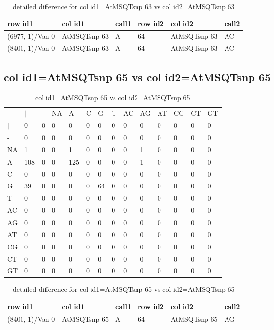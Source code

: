 \begin{center}
\begin{longtable}{|l|l|l|l|l|l|}
\caption{detailed difference for col id1=AtMSQTsnp 63 vs col id2=AtMSQTsnp 63} \label{table_dm951}\\
\hline
row id1&col id1&call1&row id2&col id2&call2\\
\hline
(6977, 1)/Van-0&AtMSQTsnp 63&A&64&AtMSQTsnp 63&AC\\
(8400, 1)/Van-0&AtMSQTsnp 63&A&64&AtMSQTsnp 63&AC\\
\hline
\end{longtable}
\end{center}

\subsection{col id1=AtMSQTsnp 65 vs col id2=AtMSQTsnp 65}
\begin{center}
\begin{longtable}{|l|l|l|l|l|l|l|l|l|l|l|l|l|l|}
\caption{col id1=AtMSQTsnp 65 vs col id2=AtMSQTsnp 65} \label{table_dm952}\\
\hline
\\
\hline
&$|$&-&NA&A&C&G&T&AC&AG&AT&CG&CT&GT\\
$|$&0&0&0&0&0&0&0&0&0&0&0&0&0\\
-&0&0&0&0&0&0&0&0&0&0&0&0&0\\
NA&1&0&0&1&0&0&0&0&1&0&0&0&0\\
A&108&0&0&125&0&0&0&0&1&0&0&0&0\\
C&0&0&0&0&0&0&0&0&0&0&0&0&0\\
G&39&0&0&0&0&64&0&0&0&0&0&0&0\\
T&0&0&0&0&0&0&0&0&0&0&0&0&0\\
AC&0&0&0&0&0&0&0&0&0&0&0&0&0\\
AG&0&0&0&0&0&0&0&0&0&0&0&0&0\\
AT&0&0&0&0&0&0&0&0&0&0&0&0&0\\
CG&0&0&0&0&0&0&0&0&0&0&0&0&0\\
CT&0&0&0&0&0&0&0&0&0&0&0&0&0\\
GT&0&0&0&0&0&0&0&0&0&0&0&0&0\\
\hline
\end{longtable}
\end{center}

\begin{center}
\begin{longtable}{|l|l|l|l|l|l|}
\caption{detailed difference for col id1=AtMSQTsnp 65 vs col id2=AtMSQTsnp 65} \label{table_dm953}\\
\hline
row id1&col id1&call1&row id2&col id2&call2\\
\hline
(8400, 1)/Van-0&AtMSQTsnp 65&A&64&AtMSQTsnp 65&AG\\
\hline
\end{longtable}
\end{center}

